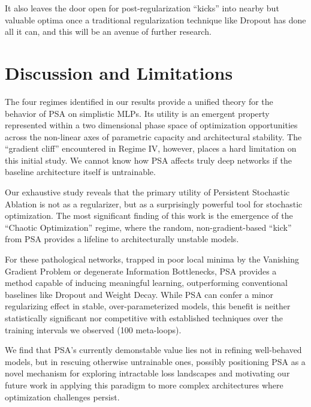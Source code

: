 \documentclass[conference]{IEEEtran}
\begin{document}
It also leaves the door open for post-regularization ``kicks'' into nearby but valuable optima once a traditional regularization technique like Dropout has done all it can, and this will be an avenue of further research.

\section{Discussion and Limitations}
The four regimes identified in our results provide a unified theory for the behavior of PSA on simplistic MLPs. Its utility is an emergent property represented within a two dimensional phase space of optimization opportunities across the non-linear axes of parametric capacity and architectural stability. The ``gradient cliff'' encountered in Regime IV, however, places a hard limitation on this initial study. We cannot know how PSA affects truly deep networks if the baseline architecture itself is untrainable.

Our exhaustive study reveals that the primary utility of Persistent Stochastic Ablation is not as a regularizer, but as a surprisingly powerful tool for stochastic optimization. The most significant finding of this work is the emergence of the ``Chaotic Optimization'' regime, where the random, non-gradient-based ``kick'' from PSA provides a lifeline to architecturally unstable models.

For these pathological networks, trapped in poor local minima by the Vanishing Gradient Problem or degenerate Information Bottlenecks, PSA provides a method capable of inducing meaningful learning, outperforming conventional baselines like Dropout and Weight Decay. While PSA can confer a minor regularizing effect in stable, over-parameterized models, this benefit is neither statistically significant nor competitive with established techniques over the training intervals we observed (100 meta-loops).

We find that PSA's currently demonstable value lies not in refining well-behaved models, but in rescuing otherwise untrainable ones, possibly positioning PSA as a novel mechanism for exploring intractable loss landscapes and motivating our future work in applying this paradigm to more complex architectures where optimization challenges persist.
\end{document}

